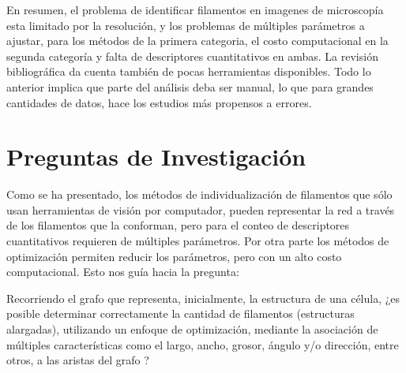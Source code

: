 \documentclass{article}
\begin{document}
En resumen, el problema de identificar filamentos en imagenes de microscop\'ia esta limitado por la resoluci\'on, y los problemas de m\'ultiples par\'ametros a ajustar, para los m\'etodos de la primera categoria, el costo computacional en la segunda categor\'ia y falta de descriptores cuantitativos en ambas. La revisi\'on bibliogr\'afica da cuenta tambi\'en de pocas herramientas disponibles. Todo lo anterior implica que parte del an\'alisis deba ser manual, lo que para grandes cantidades de datos, hace los estudios m\'as propensos a errores. 

\section{Preguntas de Investigaci\'on}

Como se ha presentado, los m\'etodos de individualizaci\'on de filamentos que s\'olo usan herramientas de visi\'on por computador, pueden representar la red a trav\'es de los filamentos que la conforman, pero para el conteo de descriptores cuantitativos requieren de m\'ultiples par\'ametros. Por otra parte los m\'etodos de optimizaci\'on permiten reducir los par\'ametros, pero con un alto costo computacional. Esto nos gu\'ia hacia la pregunta:

\smallskip
Recorriendo el grafo que representa, inicialmente, la estructura de una c\'elula, ¿es posible determinar correctamente la cantidad de filamentos (estructuras alargadas), utilizando un enfoque de optimizaci\'on, mediante la asociaci\'on de m\'ultiples caracter\'isticas como el largo, ancho, grosor, \'angulo y/o direcci\'on, entre otros, a las aristas del grafo ? 
\end{document}
